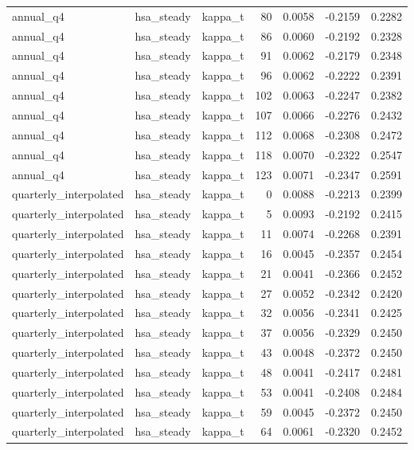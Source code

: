 \begin{tabular}{lllrrrr}
annual\_q4 & hsa\_steady & kappa\_t & 80 & 0.0058 & -0.2159 & 0.2282 \\
annual\_q4 & hsa\_steady & kappa\_t & 86 & 0.0060 & -0.2192 & 0.2328 \\
annual\_q4 & hsa\_steady & kappa\_t & 91 & 0.0062 & -0.2179 & 0.2348 \\
annual\_q4 & hsa\_steady & kappa\_t & 96 & 0.0062 & -0.2222 & 0.2391 \\
annual\_q4 & hsa\_steady & kappa\_t & 102 & 0.0063 & -0.2247 & 0.2382 \\
annual\_q4 & hsa\_steady & kappa\_t & 107 & 0.0066 & -0.2276 & 0.2432 \\
annual\_q4 & hsa\_steady & kappa\_t & 112 & 0.0068 & -0.2308 & 0.2472 \\
annual\_q4 & hsa\_steady & kappa\_t & 118 & 0.0070 & -0.2322 & 0.2547 \\
annual\_q4 & hsa\_steady & kappa\_t & 123 & 0.0071 & -0.2347 & 0.2591 \\
quarterly\_interpolated & hsa\_steady & kappa\_t & 0 & 0.0088 & -0.2213 & 0.2399 \\
quarterly\_interpolated & hsa\_steady & kappa\_t & 5 & 0.0093 & -0.2192 & 0.2415 \\
quarterly\_interpolated & hsa\_steady & kappa\_t & 11 & 0.0074 & -0.2268 & 0.2391 \\
quarterly\_interpolated & hsa\_steady & kappa\_t & 16 & 0.0045 & -0.2357 & 0.2454 \\
quarterly\_interpolated & hsa\_steady & kappa\_t & 21 & 0.0041 & -0.2366 & 0.2452 \\
quarterly\_interpolated & hsa\_steady & kappa\_t & 27 & 0.0052 & -0.2342 & 0.2420 \\
quarterly\_interpolated & hsa\_steady & kappa\_t & 32 & 0.0056 & -0.2341 & 0.2425 \\
quarterly\_interpolated & hsa\_steady & kappa\_t & 37 & 0.0056 & -0.2329 & 0.2450 \\
quarterly\_interpolated & hsa\_steady & kappa\_t & 43 & 0.0048 & -0.2372 & 0.2450 \\
quarterly\_interpolated & hsa\_steady & kappa\_t & 48 & 0.0041 & -0.2417 & 0.2481 \\
quarterly\_interpolated & hsa\_steady & kappa\_t & 53 & 0.0041 & -0.2408 & 0.2484 \\
quarterly\_interpolated & hsa\_steady & kappa\_t & 59 & 0.0045 & -0.2372 & 0.2450 \\
quarterly\_interpolated & hsa\_steady & kappa\_t & 64 & 0.0061 & -0.2320 & 0.2452 \\

\end{tabular}
